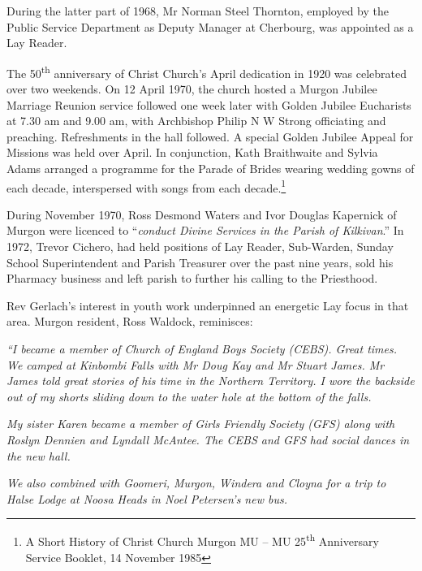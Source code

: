 During the latter part of 1968, Mr Norman Steel Thornton, employed by the Public Service Department as Deputy Manager at Cherbourg, was appointed as a Lay Reader.



The 50\textsuperscript{th} anniversary of Christ Church's April dedication in 1920 was celebrated over two weekends. On 12 April 1970, the church hosted a Murgon Jubilee Marriage Reunion service followed one week later with Golden Jubilee Eucharists at 7.30 am and 9.00 am, with Archbishop Philip N W Strong officiating and preaching. Refreshments in the hall followed. A special Golden Jubilee Appeal for Missions was held over April. In conjunction, Kath Braithwaite and Sylvia Adams arranged a programme for the Parade of Brides wearing wedding gowns of each decade, interspersed with songs from each decade.\footnote{A Short History of Christ Church Murgon MU -- MU 25\textsuperscript{th} Anniversary Service Booklet, 14 November 1985}


During November 1970, Ross Desmond Waters and Ivor Douglas Kapernick of Murgon were licenced to ``\emph{conduct Divine Services in the Parish of Kilkivan}.'' In 1972, Trevor Cichero, had held positions of Lay Reader, Sub-Warden, Sunday School Superintendent and Parish Treasurer over the past nine years, sold his Pharmacy business and left parish to further his calling to the Priesthood.



Rev Gerlach's interest in youth work underpinned an energetic Lay focus in that area. Murgon resident, Ross Waldock, reminisces:



\emph{``I became a member of Church of England Boys Society (CEBS). Great times. We camped at Kinbombi Falls with Mr Doug Kay and Mr Stuart James. Mr James told great stories of his time in the Northern Territory. I wore the backside out of my shorts sliding down to the water hole at the bottom of the falls.}



\smallskip


\emph{My sister Karen became a member of Girls Friendly Society (GFS) along with Roslyn Dennien and Lyndall McAntee. The CEBS and GFS had social dances in the new hall.}



\emph{We also combined with Goomeri, Murgon, Windera and Cloyna for a trip to Halse Lodge at Noosa Heads in Noel Petersen's new bus.}



